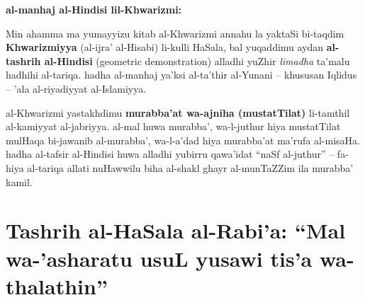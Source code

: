\documentclass[11pt,a4paper]{book}
\begin{document}
\begin{commentary}
\textbf{al-manhaj al-Hindisi lil-Khwarizmi:}

Min ahamma ma yumayyizu kitab al-Khwarizmi annahu la yaktaSi bi-taqdim
\textbf{Khwarizmiyya} (al-ijra' al-Hisabi) li-kulli HaSala, bal
yuqaddimu aydan \textbf{al-tashrih al-Hindisi} (geometric demonstration)
alladhi yuZhir \textit{limadha} ta'malu hadhihi al-tariqa. hadha
al-manhaj ya'ksi al-ta'thir al-Yunani -- khususan Iqlidus -- 'ala
al-riyadiyyat al-Islamiyya.

al-Khwarizmi yastakhdimu \textbf{murabba'at wa-ajniha (mustatTilat)}
li-tamthil al-kamiyyat al-jabriyya. al-mal huwa murabba', wa-l-juthur
hiya mustatTilat mulHaqa bi-jawanib al-murabba', wa-l-a'dad hiya
murabba'at ma'rufa al-misaHa. hadha al-tafsir al-Hindisi huwa alladhi
yubirru qawa'idat ``naSf al-juthur'' -- fa-hiya al-tariqa allati
nuHawwilu biha al-shakl ghayr al-munTaZZim ila murabba' kamil.
\end{commentary}

\section{Tashrih al-HaSala al-Rabi'a: ``Mal wa-'asharatu usuL yusawi tis'a wa-thalathin''}
\end{document}
